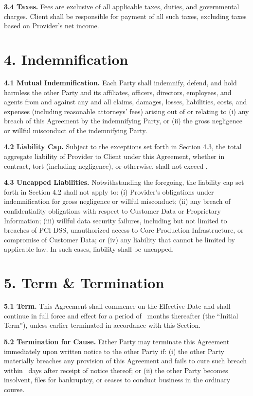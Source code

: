 \documentclass[11pt]{article}
\begin{document}
\textbf{3.4 Taxes.} Fees are exclusive of all applicable taxes, duties, and governmental
charges. Client shall be responsible for payment of all such taxes, excluding taxes based on
Provider's net income.

\section*{4. Indemnification}
\textbf{4.1 Mutual Indemnification.} Each Party shall indemnify, defend, and hold harmless
the other Party and its affiliates, officers, directors, employees, and agents from and
against any and all claims, damages, losses, liabilities, costs, and expenses (including
reasonable attorneys' fees) arising out of or relating to (i) any breach of this Agreement
by the indemnifying Party, or (ii) the gross negligence or willful misconduct of the
indemnifying Party.

\textbf{4.2 Liability Cap.} Subject to the exceptions set forth in Section 4.3, the total
aggregate liability of Provider to Client under this Agreement, whether in contract, tort
(including negligence), or otherwise, shall not exceed \LiabilityCapAmount.

\textbf{4.3 Uncapped Liabilities.} Notwithstanding the foregoing, the liability cap set
forth in Section 4.2 shall not apply to: (i) Provider's obligations under indemnification
for gross negligence or willful misconduct; (ii) any breach of confidentiality obligations
with respect to Customer Data or Proprietary Information; (iii) willful data security
failures, including but not limited to breaches of PCI DSS, unauthorized access to Core
Production Infrastructure, or compromise of Customer Data; or (iv) any liability that
cannot be limited by applicable law. In such cases, liability shall be uncapped.

\section*{5. Term \& Termination}
\textbf{5.1 Term.} This Agreement shall commence on the Effective Date and shall continue
in full force and effect for a period of \InitialTermMonths\ months thereafter (the
``Initial Term''), unless earlier terminated in accordance with this Section.

\textbf{5.2 Termination for Cause.} Either Party may terminate this Agreement immediately
upon written notice to the other Party if: (i) the other Party materially breaches any
provision of this Agreement and fails to cure such breach within \CureDays\ days after
receipt of notice thereof; or (ii) the other Party becomes insolvent, files for bankruptcy,
or ceases to conduct business in the ordinary course.
\end{document}
